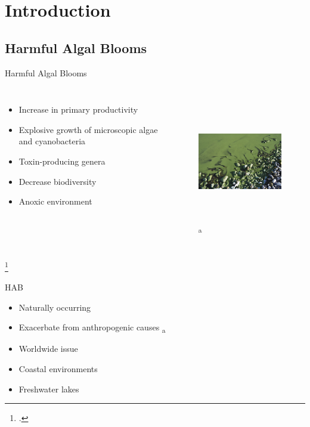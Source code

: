 \section{Introduction}

\subsection{Harmful Algal Blooms}
\begin{frame}{Harmful Algal Blooms}

\begin{columns}

	\begin{itemize}
		\item Increase in primary productivity
		\item Explosive growth of microscopic algae and cyanobacteria
		\item Toxin-producing genera
		\item Decrease biodiversity
		\item Anoxic environment
	\end{itemize}

	\begin{figure}
		\hspace*{-1cm}
		\includegraphics[width=2in,height=2in]{algal.jpg} \textsubscript{a}
		
	\end{figure}
\end{columns}
\footcitetext{[a]http://www.pme.com/wp-content/uploads/algal.jpg}
\end{frame}
\begin{frame}{HAB}

	\begin{itemize}
		\item Naturally occurring
		\item Exacerbate from anthropogenic causes \textsubscript{a}
		\item Worldwide issue
		\item Coastal environments
		\item Freshwater lakes
	\end{itemize}

\end{frame}

